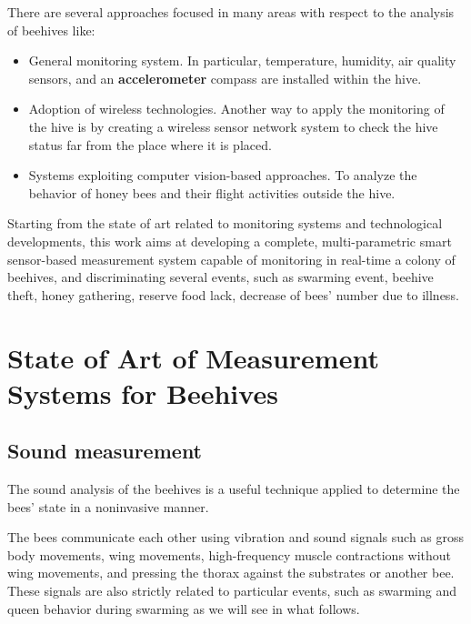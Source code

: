 \documentclass[12pt]{report}
\begin{document}
	\par There are several approaches focused in many areas with respect to the analysis of beehives like:
	\begin{itemize}
		\item General monitoring system. In particular, temperature, humidity, air quality sensors, and an \textbf{accelerometer} compass are installed within the hive.
		\item Adoption of wireless technologies. Another way to apply the monitoring of the hive is by creating a wireless sensor network system to check the hive status far from the place where it is placed.
		\item Systems exploiting computer vision-based approaches. To analyze the behavior of honey bees and their flight activities outside the hive.
	\end{itemize}
	
	Starting from the state of art related to monitoring systems and technological developments, this work aims at developing a complete, multi-parametric smart sensor-based measurement system capable of monitoring in real-time a colony of beehives, and discriminating several events, such as swarming event, beehive theft, honey gathering, reserve food lack, decrease of bees' number due to illness.
	
	\section{State of Art of Measurement Systems for Beehives}
	
	\subsection{Sound measurement}
	
	The sound analysis of the beehives is a useful technique applied to determine the bees' state in a noninvasive manner.
	
	\par The bees communicate each other using vibration and sound signals such as gross body movements, wing movements, high-frequency muscle contractions without wing movements, and pressing the thorax against the substrates or another bee. These signals are also strictly related to particular events, such as swarming and queen behavior during swarming as we will see in what follows.
	
\end{document}
